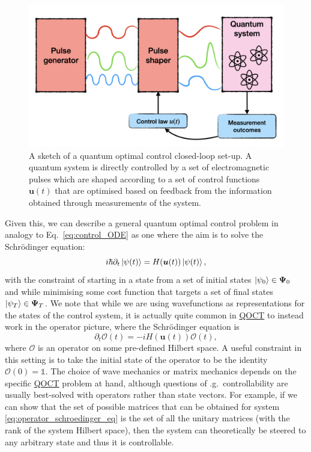 \documentclass[a4paper,oneside,11pt]{book}
\newcommand{\ubb}{\boldsymbol{u}}
\newcommand{\acrref}[1]{\hyperref[acr:#1]{#1}}
\begin{document}
\begin{figure}[t]
\centering
\includegraphics[width=0.8\linewidth]{images/optimal_control_placeholder.png} \caption[Schematic diagram of open-loop quantum optimal control]{A sketch of a quantum optimal control closed-loop set-up. A quantum system is directly controlled by a set of electromagnetic pulses which are shaped according to a set of control functions $\ubb(t)$ that are optimised based on feedback from the information obtained through measurements of the system.}\label{fig:quantum_optimal_control}
\end{figure}

Given this, we can describe a general quantum optimal control problem in analogy to Eq.~\eqref{eq:control_ODE} as one where the aim is to solve the Schr\"{o}dinger equation:
\begin{equation}\label{eq:optimal_control_schroedinger}
    i \hbar \partial_t \ket{\psi(t)} = H(\ubb(t))\ket{\psi(t)},
\end{equation}
with the constraint of starting in a state from a set of initial states $\ket{\psi_0} \in \boldsymbol \Psi_0$ and while minimising some cost function that targets a set of final states $\ket{\psi_T} \in \boldsymbol \Psi_T$. We note that while we are using wavefunctions as representations for the states of the control system, it is actually quite common in \acrref{QOCT} to instead work in the operator picture, where the Schr\"{o}dinger equation is
\begin{equation}\label{eq:operator_schroedinger_eq}
    \partial_t \mathcal{O}(t) = -i H(\ubb(t))\mathcal{O}(t),
\end{equation}
where $\mathcal{O}$ is an operator on some pre-defined Hilbert space. A useful constraint in this setting is to take the initial state of the operator to be the identity $\mathcal{O}(0) = \mathds{1}$. The choice of wave mechanics or matrix mechanics depends on the specific \acrref{QOCT} problem at hand, although questions of \@e.g.~controllability are usually best-solved with operators rather than state vectors. For example, if we can show that the set of possible matrices that can be obtained for system \eqref{eq:operator_schroedinger_eq} is the set of all the unitary matrices (with the rank of the system Hilbert space), then the system can theoretically be steered to any arbitrary state and thus it is controllable. 
\end{document}
